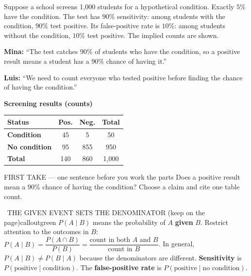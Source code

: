 \documentclass[11pt]{article}
\begin{document}
\clearpage
{}

Suppose a school screens 1{,}000 students for a hypothetical condition. Exactly $5\%$ have the condition. The test has $90\%$ sensitivity: among students with the condition, $90\%$ test positive. Its false-positive rate is $10\%$: among students without the condition, $10\%$ test positive. The implied counts are shown.\par\smallskip \textbf{Mina:} ``The test catches $90\%$ of students who have the condition, so a positive result means a student has a $90\%$ chance of having it.''\par \textbf{Luis:} ``We need to count everyone who tested positive before finding the chance of having the condition.''\par
\begin{center}
\textbf{Screening results (counts)}\par\smallskip
\begin{tabular}{|l|c|c|c|}
\hline
\textbf{Status} & \textbf{Pos.} & \textbf{Neg.} & \textbf{Total} \\ \hline
\textbf{Condition} & 45 & 5 & 50 \\ \hline
\textbf{No condition} & 95 & 855 & 950 \\ \hline
\textbf{Total} & 140 & 860 & 1{,}000 \\ \hline
\end{tabular}
\end{center}
\begin{firsttakebox}{FIRST TAKE --- one sentence before you work the parts}
Does a positive result mean a $90\%$ chance of having the condition? Choose a claim and cite one table count.\par
{}
\end{firsttakebox}

\begin{callout}{\IconBook\ THE GIVEN EVENT SETS THE DENOMINATOR (keep on the page)}{calloutgreen}
$P(A\mid B)$ means the probability of $A$ \textbf{given} $B$. Restrict attention to the outcomes in $B$:
$P(A\mid B)=\dfrac{P(A\cap B)}{P(B)}=\dfrac{\text{count in both }A\text{ and }B}{\text{count in }B}$.
In general, $P(A\mid B)\neq P(B\mid A)$ because the denominators are different.
\textbf{Sensitivity} is $P(\text{positive}\mid\text{condition})$.
The \textbf{false-positive rate} is $P(\text{positive}\mid\text{no condition})$.
\end{callout}
\end{document}
